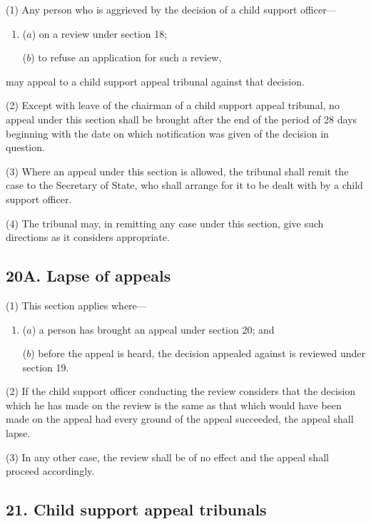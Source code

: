 \documentclass[12pt,a4paper]{article}
\begin{document}
(1) Any person who is aggrieved by the decision of a child support officer—
\begin{enumerate}\item[]
($a$) on a review under section 18;

($b$) to refuse an application for such a review,
\end{enumerate}
may appeal to a child support appeal tribunal against that decision.

(2) Except with leave of the chairman of a child support appeal tribunal, no appeal under this section shall be brought after the end of the period of 28 days beginning with the date on which notification was given of the decision in question.

(3) Where an appeal under this section is allowed, the tribunal shall remit the case to the Secretary of State, who shall arrange for it to be dealt with by a child support officer.

(4) The tribunal may, in remitting any case under this section, give such directions as it considers appropriate.


\subsection{20A. Lapse of appeals}

(1) This section applies where—
\begin{enumerate}\item[]
($a$) a person has brought an appeal under section 20; and

($b$) before the appeal is heard, the decision appealed against is reviewed under section 19.
\end{enumerate}

(2) If the child support officer conducting the review considers that the decision which he has made on the review is the same as that which would have been made on the appeal had every ground of the appeal succeeded, the appeal shall lapse.

(3) In any other case, the review shall be of no effect and the appeal shall proceed accordingly.


\subsection{21. Child support appeal tribunals}
\end{document}
